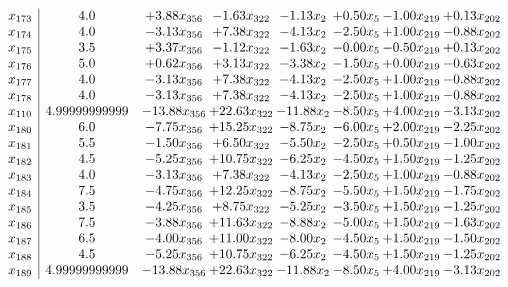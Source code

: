 \documentclass[8pt]{article}
\begin{document}
\[\begin{array}{c| c c@{\hskip 2pt} c@{\hskip 2pt} c@{\hskip 2pt} c@{\hskip 2pt} c@{\hskip 2pt} c@{\hskip 2pt} }
 x_{173}   &  4.0 & +  3.88 x_{356} & -1.63 x_{322} & -1.13 x_{2} & +  0.50 x_{5} & -1.00 x_{219} & +  0.13 x_{202}\\
 x_{174}   &  4.0 & -3.13 x_{356} & +  7.38 x_{322} & -4.13 x_{2} & -2.50 x_{5} & +  1.00 x_{219} & -0.88 x_{202}\\
 x_{175}   &  3.5 & +  3.37 x_{356} & -1.12 x_{322} & -1.63 x_{2} & -0.00 x_{5} & -0.50 x_{219} & +  0.13 x_{202}\\
 x_{176}   &  5.0 & +  0.62 x_{356} & +  3.13 x_{322} & -3.38 x_{2} & -1.50 x_{5} & +  0.00 x_{219} & -0.63 x_{202}\\
 x_{177}   &  4.0 & -3.13 x_{356} & +  7.38 x_{322} & -4.13 x_{2} & -2.50 x_{5} & +  1.00 x_{219} & -0.88 x_{202}\\
 x_{178}   &  4.0 & -3.13 x_{356} & +  7.38 x_{322} & -4.13 x_{2} & -2.50 x_{5} & +  1.00 x_{219} & -0.88 x_{202}\\
 x_{110}   &  4.99999999999 & -13.88 x_{356} & + 22.63 x_{322} & -11.88 x_{2} & -8.50 x_{5} & +  4.00 x_{219} & -3.13 x_{202}\\
 x_{180}   &  6.0 & -7.75 x_{356} & + 15.25 x_{322} & -8.75 x_{2} & -6.00 x_{5} & +  2.00 x_{219} & -2.25 x_{202}\\
 x_{181}   &  5.5 & -1.50 x_{356} & +  6.50 x_{322} & -5.50 x_{2} & -2.50 x_{5} & +  0.50 x_{219} & -1.00 x_{202}\\
 x_{182}   &  4.5 & -5.25 x_{356} & + 10.75 x_{322} & -6.25 x_{2} & -4.50 x_{5} & +  1.50 x_{219} & -1.25 x_{202}\\
 x_{183}   &  4.0 & -3.13 x_{356} & +  7.38 x_{322} & -4.13 x_{2} & -2.50 x_{5} & +  1.00 x_{219} & -0.88 x_{202}\\
 x_{184}   &  7.5 & -4.75 x_{356} & + 12.25 x_{322} & -8.75 x_{2} & -5.50 x_{5} & +  1.50 x_{219} & -1.75 x_{202}\\
 x_{185}   &  3.5 & -4.25 x_{356} & +  8.75 x_{322} & -5.25 x_{2} & -3.50 x_{5} & +  1.50 x_{219} & -1.25 x_{202}\\
 x_{186}   &  7.5 & -3.88 x_{356} & + 11.63 x_{322} & -8.88 x_{2} & -5.00 x_{5} & +  1.50 x_{219} & -1.63 x_{202}\\
 x_{187}   &  6.5 & -4.00 x_{356} & + 11.00 x_{322} & -8.00 x_{2} & -4.50 x_{5} & +  1.50 x_{219} & -1.50 x_{202}\\
 x_{188}   &  4.5 & -5.25 x_{356} & + 10.75 x_{322} & -6.25 x_{2} & -4.50 x_{5} & +  1.50 x_{219} & -1.25 x_{202}\\
 x_{189}   &  4.99999999999 & -13.88 x_{356} & + 22.63 x_{322} & -11.88 x_{2} & -8.50 x_{5} & +  4.00 x_{219} & -3.13 x_{202}\\

\end{array}\]
\end{document}
